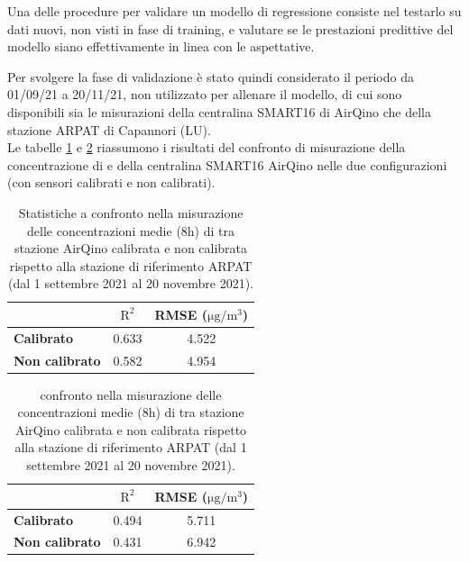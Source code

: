 Una delle procedure per validare un modello di regressione consiste nel testarlo su dati nuovi, non visti in fase di training, e valutare se le prestazioni predittive del modello siano effettivamente in linea con le aspettative.

Per svolgere la fase di validazione è stato quindi considerato il periodo da 01/09/21 a 20/11/21, non utilizzato per allenare il modello, di cui sono disponibili sia le misurazioni della centralina SMART16 di AirQino che della stazione ARPAT di Capannori (LU).\\

Le tabelle \ref{tab:val-pm25} e \ref{tab:val-pm10} riassumono i risultati del confronto di misurazione della concentrazione di  e  della centralina SMART16 AirQino nelle due configurazioni (con sensori calibrati e non calibrati).

\begin{table}[H]
\footnotesize
\centering
\begin{tabular}{|l|c|c|}
\cline{2-3}
\multicolumn{1}{c|}{} & $\bm{\mathrm{R^2}}$ & \textbf{RMSE (}$\mathrm{\si{\micro}g/m^3}$) \\ \hline
\textbf{Calibrato} & 0.633 & 4.522 \\ \hline
\textbf{Non calibrato} & 0.582 & 4.954 \\ \hline
\end{tabular}
\caption{Statistiche a confronto nella misurazione delle concentrazioni medie (8h) di  tra stazione AirQino calibrata e non calibrata rispetto alla stazione di riferimento ARPAT (dal 1 settembre 2021 al 20 novembre 2021).}
\label{tab:val-pm25}
\end{table}

\begin{table}[H]
\footnotesize
\centering
\begin{tabular}{|l|c|c|}
\cline{2-3}
\multicolumn{1}{c|}{} & $\bm{\mathrm{R^2}}$ & \textbf{RMSE (}$\mathrm{\si{\micro}g/m^3}$) \\ \hline
\textbf{Calibrato} & 0.494 & 5.711 \\ \hline
\textbf{Non calibrato} & 0.431 & 6.942 \\ \hline
\end{tabular}
\caption{confronto nella misurazione delle concentrazioni medie (8h) di  tra stazione AirQino calibrata e non calibrata rispetto alla stazione di riferimento ARPAT (dal 1 settembre 2021 al 20 novembre 2021).}
\label{tab:val-pm10}
\end{table}


